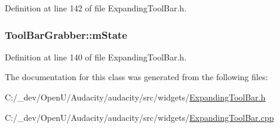 Definition at line 142 of file Expanding\+Tool\+Bar.\+h.

\subsubsection[{\texorpdfstring{m\+State}{mState}}]{ Tool\+Bar\+Grabber\+::m\+State\hspace{0.3cm}{\ttfamily [protected]}}\hypertarget{class_tool_bar_grabber_aa0dd84a915732171fcdcac179382c1e1}{}\label{class_tool_bar_grabber_aa0dd84a915732171fcdcac179382c1e1}


Definition at line 140 of file Expanding\+Tool\+Bar.\+h.



The documentation for this class was generated from the following files\+:\begin{DoxyCompactItemize}
\item 
C\+:/\+\_\+dev/\+Open\+U/\+Audacity/audacity/src/widgets/\hyperlink{_expanding_tool_bar_8h}{Expanding\+Tool\+Bar.\+h}\item 
C\+:/\+\_\+dev/\+Open\+U/\+Audacity/audacity/src/widgets/\hyperlink{_expanding_tool_bar_8cpp}{Expanding\+Tool\+Bar.\+cpp}\end{DoxyCompactItemize}
